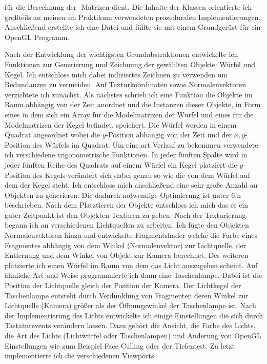\documentclass{article}
\begin{document}
für die Berechnung der -Matrizen dient. Die Inhalte der Klassen orientierte ich großteils an meinen im Praktikum
verwendeten prozeduralen Implementierungen. Anschließend erstellte ich eine  Datei und füllte sie mit einem
Grundgerüst für ein OpenGL Programm.\par
\medskip
Nach der Entwicklung der wichtigsten Grundabstraktionen entwickelte ich Funktionen zur Generierung und Zeichnung
der gewählten Objekte: Würfel und Kegel. Ich entschloss mich dabei indiziertes Zeichnen zu verwenden um Redundanzen zu
vermeiden. Auf Texturkoordinaten sowie Normalenvektoren verzichtete ich zunächst. Als nächstes schrieb ich eine
Funktion die Objekte im Raum abhängig von der Zeit anordnet und die Instanzen dieser Objekte, in Form eines 
in dem sich ein Array für die Modelmatrizen der Würfel und eines für die Modelmatrizen der Kegel befindet, speichert.
Die Würfel werden in einem Quadrat angeordnet wobei die $y$-Position abhängig von der Zeit und der $x,y$-Position des
Würfels im Quadrat. Um eine art Verlauf zu bekommen verwendete ich verschiedene trigonometrische Funktionen.
In jeder fünften Spalte wird in jeder fünften Reihe des Quadrats auf einem Würfel ein Kegel platziert
die $y$-Position des Kegels verändert sich dabei genau so wie die von dem Würfel auf dem der Kegel steht.
Ich entschloss mich anschließend eine sehr große Anzahl an Objekten zu generieren. Die dadurch notwendige Optimierung
ist unter 6.n beschrieben. Nach dem Platztieren der Objekte entschloss ich mich das es ein guter Zeitpunkt ist 
den Objekten Texturen zu geben. Nach der Texturierung begann ich an verschiedenen Lichtquellen zu arbeiten.
Ich fügte den Objekten Normalenvektoren hinzu und entwickelte Fragmentshader welche die Farbe eines Fragmentes
abhängig von dem Winkel (Normalenvektor) zur Lichtquelle, der Entfernung und dem Winkel von Objekt zur Kamera berechnet.
Des weiteren platzierte ich einen Würfel im Raum von dem das Licht auszugehen scheint.
Auf ähnliche Art und Weise programmierte ich dann eine Taschenlampe.
Dabei ist die Position der Lichtquelle gleich der Position der Kamera. Der Lichtkegel der 
Taschenlampe entsteht durch Verdunklung von Fragmenten deren Winkel zur Lichtquelle (Kamera) größer als der Öffnungswinkel
der Taschenlampe ist. Nach der Implementierung des Lichts entwickelte ich einige Einstellungen die sich durch
Tastaturevents verändern lassen. Dazu gehört die Ansicht, die Farbe des Lichts, die Art des Lichts
(Lichtwürfel oder Taschenlampen) und Änderung von OpenGL Einstellungen wie zum Beispiel Face Culling oder der Tiefentest.
Zu letzt implementierte ich die verschiedenen Viewports.
\end{document}
